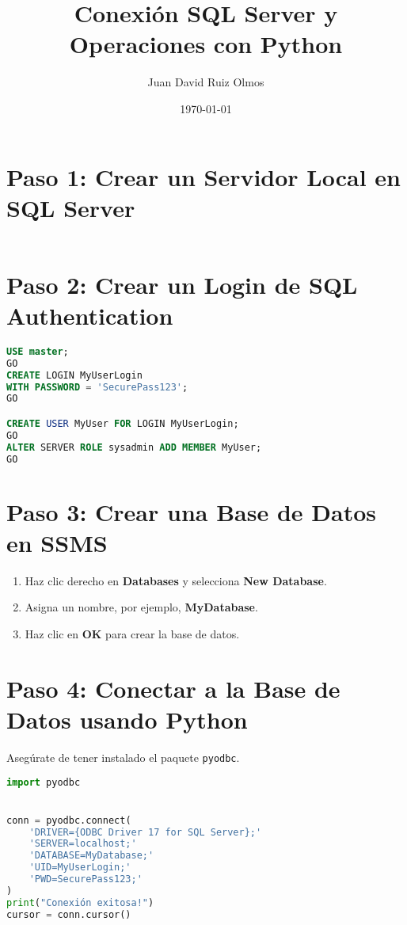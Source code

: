 \documentclass{article}
\title{Conexión SQL Server y Operaciones con Python}
\author{Juan David Ruiz Olmos}
\date{\today}
\begin{document}
\maketitle

\section{Paso 1: Crear un Servidor Local en SQL Server}
\begin{lstlisting}[language=SQL, caption=Crea un servidor local en SSMS]

\end{lstlisting}

\section{Paso 2: Crear un Login de SQL Authentication}
\begin{lstlisting}[language=SQL, caption=Crear un login SQL Authentication]
USE master;
GO
CREATE LOGIN MyUserLogin 
WITH PASSWORD = 'SecurePass123';
GO

CREATE USER MyUser FOR LOGIN MyUserLogin;
GO
ALTER SERVER ROLE sysadmin ADD MEMBER MyUser;
GO
\end{lstlisting}

\section{Paso 3: Crear una Base de Datos en SSMS}
\begin{enumerate}
    \item Haz clic derecho en \textbf{Databases} y selecciona \textbf{New Database}.
    \item Asigna un nombre, por ejemplo, \textbf{MyDatabase}.
    \item Haz clic en \textbf{OK} para crear la base de datos.
\end{enumerate}

\section{Paso 4: Conectar a la Base de Datos usando Python}
Asegúrate de tener instalado el paquete \texttt{pyodbc}.
\begin{lstlisting}[language=Python, caption=Código para conectarse a SQL Server]
import pyodbc


conn = pyodbc.connect(
    'DRIVER={ODBC Driver 17 for SQL Server};'
    'SERVER=localhost;'
    'DATABASE=MyDatabase;'
    'UID=MyUserLogin;'
    'PWD=SecurePass123;'
)
print("Conexión exitosa!")
cursor = conn.cursor()
\end{lstlisting}
\end{document}
